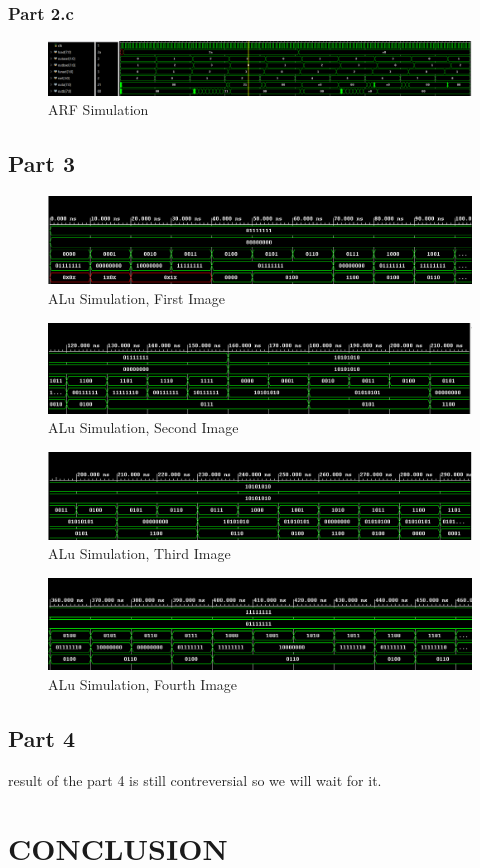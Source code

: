 \documentclass[pdftex,12pt,a4paper]{article}
\begin{document}
\subsubsection{Part 2.c}
\begin{figure}[H]
	\centering
	\includegraphics[width=1\textwidth]{results/arf.png}	
	\caption{ARF Simulation}
	\label{ARF Simulation}
\end{figure}

\subsection{Part 3}
\begin{figure}[H]
	\centering
	\includegraphics[width=1\textwidth]{results/alu_1.png}	
	\caption{ALu Simulation, First Image}
	\label{ALU Simulation 1}
\end{figure}
\begin{figure}[H]
	\centering
	\includegraphics[width=1\textwidth]{results/alu_2.png}	
	\caption{ALu Simulation, Second Image}
	\label{ALU Simulation 2}
\end{figure}
\begin{figure}[H]
	\centering
	\includegraphics[width=1\textwidth]{results/alu_3.png}	
	\caption{ALu Simulation, Third Image}
	\label{ALU Simulation 3}
\end{figure}
\begin{figure}[H]
	\centering
	\includegraphics[width=1\textwidth]{results/alu_4.png}	
	\caption{ALu Simulation, Fourth Image}
	\label{ALU Simulation 4}
\end{figure}

\subsection{Part 4}
result of the part 4 is still contreversial so we will wait for it.


\section{CONCLUSION}
\end{document}

